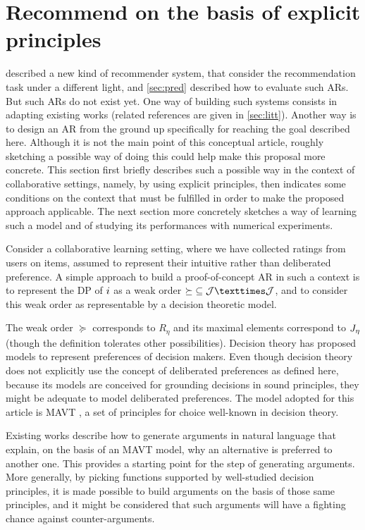 \documentclass[version=3.21, pagesize, twoside=off, bibliography=totoc, DIV=calc, fontsize=12pt, a4paper, french, english]{scrartcl}
\begin{document}
\section{Recommend on the basis of explicit principles}
\label{sec:princ}
 described a new kind of recommender system, that consider the recommendation task under a different light, and \cref{sec:pred} described how to evaluate such \acp{AR}. But such \acp{AR} do not exist yet. One way of building such systems consists in adapting existing works (related references are given in \cref{sec:litt}). Another way is to design an \ac{AR} from the ground up specifically for reaching the goal described here. Although it is not the main point of this conceptual article, roughly sketching a possible way of doing this could help make this proposal more concrete. This section first briefly describes such a possible way in the context of collaborative settings, namely, by using explicit principles, then indicates some conditions on the context that must be fulfilled in order to make the proposed approach applicable. The next section more concretely sketches a way of learning such a model and of studying its performances with numerical experiments.

Consider a collaborative learning setting, where we have collected ratings from users on items, assumed to represent their intuitive rather than deliberated preference. 
A simple approach to build a proof-of-concept \ac{AR} in such a context is to represent the \ac{DP} of $i$ as a weak order ${\succeq} \subseteq \allitems × \allitems$, and to consider this weak order as representable by a decision theoretic model.

The weak order ${\succeq}$ corresponds to $R_\eta$ and its maximal elements correspond to $J_{\eta}$ (though the definition tolerates other possibilities). Decision theory has proposed models to represent preferences of decision makers. Even though decision theory does not explicitly use the concept of deliberated preferences as defined here, because its models are conceived for grounding decisions in sound principles, they might be adequate to model deliberated preferences. 
The model adopted for this article is \ac{MAVT} \citep{keeney_decisions_1993}, a set of principles for choice well-known in decision theory.

Existing works \citep{carenini_generating_2006, labreuche_general_2011} describe how to generate arguments in natural language that explain, on the basis of an \ac{MAVT} model, why an alternative is preferred to another one. This provides a starting point for the step of generating arguments.
More generally, by picking functions supported by well-studied decision principles, it is made possible to build arguments on the basis of those same principles, and it might be considered that such arguments will have a fighting chance against counter-arguments.
\end{document}
